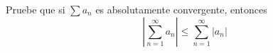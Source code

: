 \item Pruebe que si $\sum a_n$ es absolutamente convergente, entonces
    \[ \left| \sum_{n=1}^\infty a_n \right| \le \sum_{n=1}^\infty |a_n| \]
